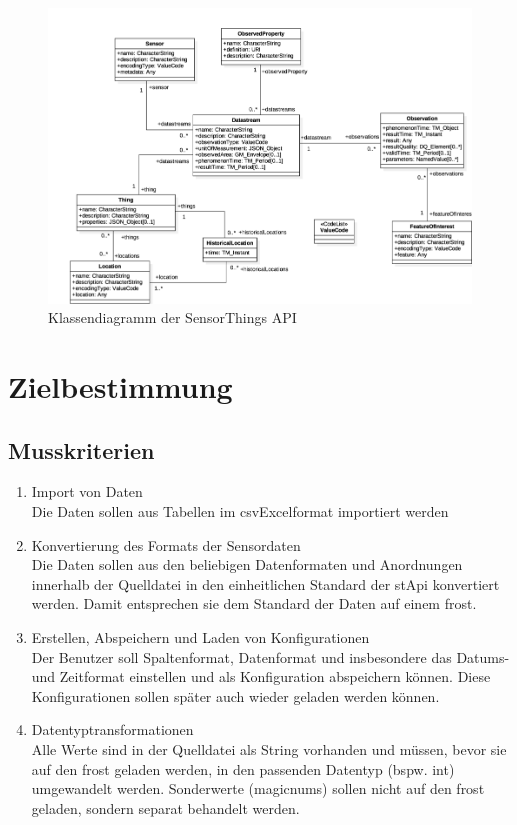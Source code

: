 \documentclass[a4paper, 12 pt]{article}
\begin{document}
\begin{figure}
\centering
\includegraphics[scale=0.8]{images/ogc}
\caption{\label{fig:ogc}Klassendiagramm der SensorThings API}
\end{figure}

\newpage
\section{Zielbestimmung}
	\subsection{Musskriterien}
	\begin{enumerate}
	\item Import von Daten \\
	Die Daten sollen aus Tabellen im \gls{csvExcel}format importiert werden
	\item Konvertierung des Formats der Sensordaten \\
	Die Daten sollen aus den beliebigen Datenformaten und Anordnungen innerhalb der Quelldatei in den einheitlichen Standard der \gls{stApi} konvertiert werden.
	Damit entsprechen sie dem Standard der Daten auf einem \gls{frost}.
	\item Erstellen, Abspeichern und Laden von Konfigurationen \\
	Der Benutzer soll Spaltenformat, Datenformat und insbesondere das Datums- und Zeitformat einstellen und als Konfiguration abspeichern können.
	Diese Konfigurationen sollen später auch wieder geladen werden können.
	\item Datentyptransformationen \\
	Alle Werte sind in der Quelldatei als String vorhanden und müssen, bevor sie auf den \gls{frost} geladen werden, in den passenden Datentyp (bspw. \gls{int}) umgewandelt werden.
	Sonderwerte (\glspl{magicnum}) sollen nicht auf den \gls{frost} geladen, sondern separat behandelt werden.
	\end{enumerate}
\end{document}
